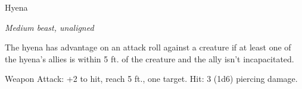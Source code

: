 \begin{monsterbox}{Hyena}
\begin{hangingpar}
\textit{Medium beast, unaligned}
\end{hangingpar}
\dndline%
\basics[%
armorclass = 11,
hitpoints = 1d8 + 1,
speed = {50 ft.}
]
\dndline%
\stats[%
STR = \stat{11},
DEX = \stat{13},
CON = \stat{12},
INT = \stat{2},
WIS = \stat{12},
CHA = \stat{5}
]
\dndline%
\details[%
skills={Perception +3, },
damageimmunities={},
savingthrows={},
conditionimmunities={},
damageresistances={},
damagevulnerabilities={},
senses={passive Perception 13},
challenge=0
]
\dndline%
\begin{monsteraction}
The hyena has advantage on an attack roll against a creature if at least one of the hyena's allies is within 5 ft. of the creature and the ally isn't incapacitated.
\end{monsteraction}
\begin{monsteraction}[Bite]
Weapon Attack: +2 to hit, reach 5 ft., one target. Hit: 3 (1d6) piercing damage.
\end{monsteraction}
\end{monsterbox}